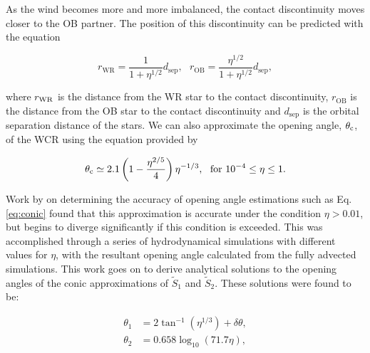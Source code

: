 As the wind becomes more and more imbalanced, the contact discontinuity moves closer to the OB partner.
The position of this discontinuity can be predicted with the equation

\begin{equation}
  r_\text{WR} = \frac{1}{1+\eta^{1/2}} d_\text{sep} , ~~~ r_\text{OB} = \frac{\eta^{1/2}}{1+\eta^{1/2}} d_\text{sep} ,
\end{equation}

\noindent
where $r_\text{WR}$ is the distance from the WR star to the contact discontinuity, $r_\text{OB}$ is the distance from the OB star to the contact discontinuity and $d_\text{sep}$ is the orbital separation distance of the stars.
We can also approximate the opening angle, $\theta_\text{c}$, of the WCR using the equation provided by \textcite{eichler_particle_1993}

\begin{equation}
  \theta_\text{c} \simeq 2.1 \left(1 - \frac{\eta^{2/5}}{4}\right) \eta^{-1/3}, ~~ \text{for } 10^{-4} \leq \eta \leq 1. \label{eq:conic}
\end{equation}



\noindent
Work by \textcite{pittardCollidingStellarWinds2018} on determining the accuracy of opening angle estimations such as Eq. \ref{eq:conic} found that this approximation is accurate under the condition $\eta > 0.01$, but begins to diverge significantly if this condition is exceeded.
This was accomplished through a series of hydrodynamical simulations with different values for $\eta$, with the resultant opening angle calculated from the fully advected simulations.
This work goes on to derive analytical solutions to the opening angles of the conic approximations of $\widetilde{S}_1$ and $\widetilde{S}_2$.
These solutions were found to be:

\begin{subequations}
  \begin{align}
    \theta_1 & = 2 \tan^{-1} \left(\eta^{1/3}\right) + \delta \theta , \\
    \theta_2 & = 0.658 \log_{10} \left(71.7 \eta \right) ,
  \end{align}
\end{subequations}

